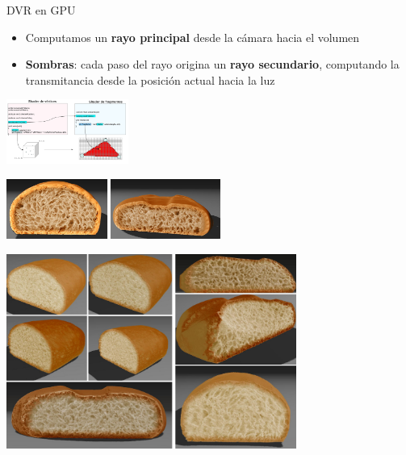 \documentclass[spanish,unknownkeysallowed,10pt]{beamer}
\begin{document}


\begin{frame}{DVR en GPU}

\begin{itemize}
\item Computamos un \textbf{rayo principal} desde la cámara hacia el volumen
\item \textbf{Sombras}: cada paso del rayo origina un \textbf{rayo secundario}, computando la transmitancia desde la posición actual hacia la luz
\end{itemize}

\centerline{\includegraphics[width=4cm]{../figures/fragmentshader}}

\end{frame}

\begin{frame}{}

\centerline{\includegraphics[width=7cm]{../figures/Fig11CAVW}}

\centerline{\includegraphics[width=9.5cm]{../figures/Fig12CAVW}}
\end{frame}
\end{document}
